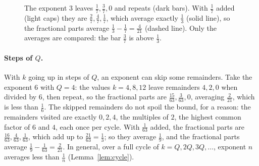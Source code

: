 \documentclass[10pt]{article}
\theoremstyle{plain}
\theoremstyle{definition}
\theoremstyle{remark}
\begin{document}
\begin{figure}[htb]
\centering
{}
\caption{The exponent $3$ leaves $\tfrac17,\tfrac37,0$ and repeats (dark bars).
With $\tfrac17$ added (light caps) they are $\tfrac27,\tfrac47,\tfrac17$, which
average exactly $\tfrac13$ (solid line), so the fractional parts average
$\tfrac13-\tfrac17=\tfrac4{21}$ (dashed line). Only the averages are compared:
the bar $\tfrac37$ is above $\tfrac13$.}
\label{fig:bars}
\end{figure}

\paragraph{Steps of $Q$.} With $k$ going up in steps of $Q$, an exponent can
skip some remainders. Take the exponent $6$ with $Q=4$: the values $k=4,8,12$
leave remainders $4,2,0$ when divided by $6$, then repeat, so the fractional parts
are $\tfrac{15}{63},\tfrac3{63},0$, averaging $\tfrac2{21}$, which is less than
$\tfrac16$. The skipped remainders do not spoil the bound, for a reason:
the remainders visited are exactly $0,2,4$, the multiples of $2$, the highest
common factor of $6$ and $4$, each once per cycle. With $\tfrac1{63}$ added,
the fractional parts are $\tfrac{16}{63},\tfrac4{63},\tfrac1{63}$, which add up to
$\tfrac{21}{63}=\tfrac13$; so they average $\tfrac19$, and the fractional parts
average $\tfrac19-\tfrac1{63}=\tfrac2{21}$. In general, over a full cycle of $k=Q,2Q,3Q,\dots$,
exponent $n$ averages less than $\tfrac1n$ (Lemma~\ref{lem:cycle}).
\end{document}
